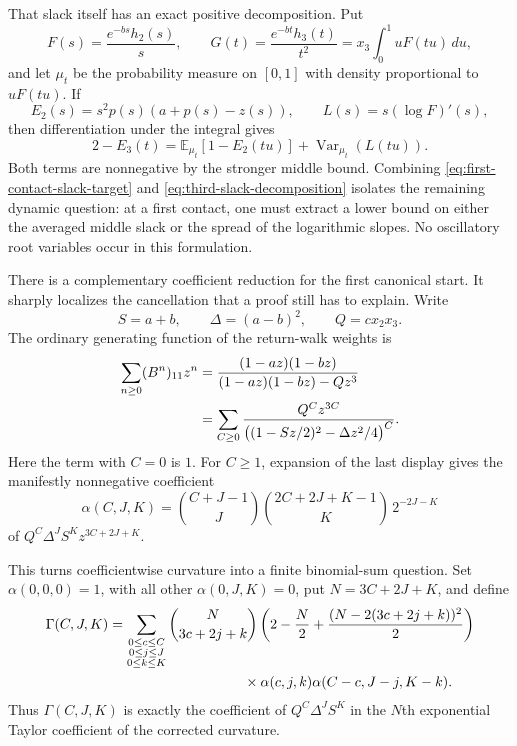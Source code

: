 \documentclass[11pt]{article}
\newcommand{\E}{\mathbb E}
\theoremstyle{remark}
\begin{document}
That slack itself has an exact positive decomposition.  Put
\[
 F(s)=\frac{e^{-bs}h_2(s)}s,
 \qquad
 G(t)=\frac{e^{-bt}h_3(t)}{t^2}
     =x_3\int_0^1uF(tu)\,du,
\]
and let $\mu_t$ be the probability measure on $[0,1]$ with density
proportional to $uF(tu)$.  If
\[
 E_2(s)=s^2p(s)(a+p(s)-z(s)),
 \qquad L(s)=s(\log F)'(s),
\]
then differentiation under the integral gives
\begin{equation}\label{eq:third-slack-decomposition}
 2-E_3(t)
 =\E_{\mu_t}[1-E_2(tu)]
  +\operatorname{Var}_{\mu_t}(L(tu)).
\end{equation}
Both terms are nonnegative by the stronger middle bound.  Combining
\eqref{eq:first-contact-slack-target} and
\eqref{eq:third-slack-decomposition} isolates the remaining dynamic question:
at a first contact, one must extract a lower bound on either the averaged
middle slack or the spread of the logarithmic slopes.  No oscillatory root
variables occur in this formulation.

There is a complementary coefficient reduction for the first canonical
start.  It sharply localizes the cancellation that a proof still has to
explain.  Write
\[
 S=a+b,\qquad \Delta=(a-b)^2,\qquad Q=cx_2x_3.
\]
The ordinary generating function of the return-walk weights is
\begin{align}
 \sum_{n\geq0}(B^n)_{11}z^n
 &=\frac{(1-az)(1-bz)}
         {(1-az)(1-bz)-Qz^3} \notag\\
 &=\sum_{C\geq0}
   \frac{Q^Cz^{3C}}
        {\bigl((1-Sz/2)^2-\Delta z^2/4\bigr)^C}.
 \label{eq:canonical-positive-coordinates}
\end{align}
Here the term with $C=0$ is $1$.  For $C\geq1$, expansion of the last
display gives the manifestly nonnegative coefficient
\begin{equation}\label{eq:canonical-alpha}
 \alpha(C,J,K)=
 \binom{C+J-1}{J}
 \binom{2C+2J+K-1}{K}\,2^{-2J-K}
\end{equation}
of
$Q^C\Delta^JS^Kz^{3C+2J+K}$.

This turns coefficientwise curvature into a finite binomial-sum question.
Set $\alpha(0,0,0)=1$, with all other $\alpha(0,J,K)=0$, put
$N=3C+2J+K$, and define
\begin{equation}\label{eq:canonical-gamma}
 \begin{aligned}
 \Gamma(C,J,K)
 &=\sum_{\substack{0\leq c\leq C\\0\leq j\leq J\\0\leq k\leq K}}
 \binom{N}{3c+2j+k}
 \left(2-\frac N2+
       \frac{(N-2(3c+2j+k))^2}{2}\right)\\
 &\hspace{34mm}{}
 \times\alpha(c,j,k)\alpha(C-c,J-j,K-k).
 \end{aligned}
\end{equation}
Thus $\Gamma(C,J,K)$ is exactly the coefficient of
$Q^C\Delta^JS^K$ in the $N$th exponential Taylor coefficient of the
corrected curvature.
\end{document}
